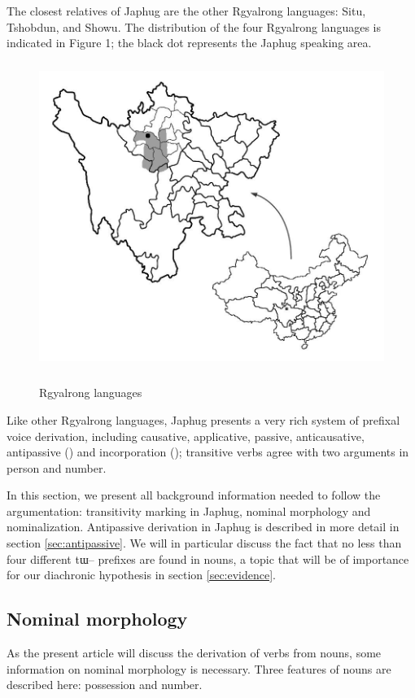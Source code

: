 \documentclass[oldfontcommands,oneside,a4paper,11pt]{article}
\newcommand{\ipa}[1]{{\phon \mbox{#1}}} %
\begin{document}
The closest relatives of Japhug are the other Rgyalrong languages: Situ, Tshobdun, and Showu. The distribution of the four Rgyalrong languages is indicated in Figure 1; the black dot represents the Japhug speaking area.
\begin{figure}[h]
\centering \label{figure:map1}
\includegraphics[height=100mm]{carte.JPG}
\caption{Rgyalrong languages}
\label{fig:rgyalrong}
\end{figure}
 

Like other Rgyalrong languages, Japhug presents a very rich system of prefixal voice derivation, including causative, applicative, passive, anticausative, antipassive (\citealt{jacques12demotion}) and incorporation (\citealt{jacques12incorp}); transitive verbs agree with two arguments in person and number.

In this section, we present all background information needed to follow the argumentation: transitivity marking in Japhug, nominal morphology and nominalization. Antipassive derivation in Japhug is described in more detail in section \ref{sec:antipassive}. We will in particular discuss the fact that no less than four different  \ipa{tɯ--} prefixes are found in nouns, a topic that will be of importance for our diachronic hypothesis in section \ref{sec:evidence}.
 
 
\subsection{Nominal morphology} \label{subsec:nominal}
As the present article will discuss the derivation of verbs from nouns, some information on nominal morphology is necessary. Three features of nouns are described here:  possession and number. 
\end{document}
